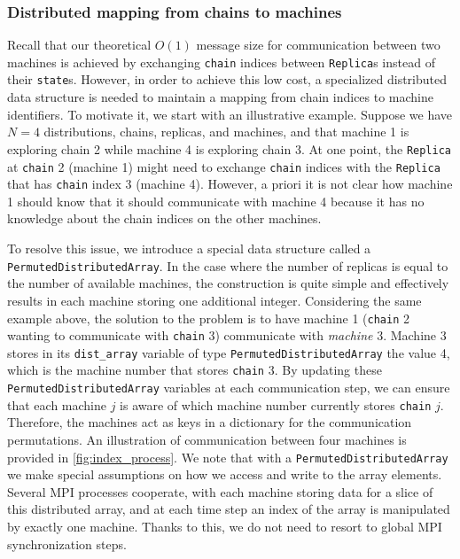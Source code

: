 \subsubsection{Distributed mapping from chains to machines}
\label{sec:permuted_dist_array}
Recall that our theoretical $O(1)$ message size for communication between two machines 
is achieved by exchanging \texttt{chain} indices between \texttt{Replica}s 
instead of their \texttt{state}s. 
However, in order to achieve this low cost, a specialized distributed data structure is 
needed to maintain a mapping from chain indices to machine identifiers. 
To motivate it, we start with an illustrative example. 
Suppose we have $N=4$ distributions, chains, replicas, and machines, and that 
machine 1 is exploring chain 2 while machine 4 is exploring chain 3.
At one point, the \texttt{Replica} at \texttt{chain} 2 (machine 1) might need to exchange
\texttt{chain} indices with the \texttt{Replica} that has \texttt{chain} index 3 (machine 4). 
However, a priori it is not clear how machine 1 should know that it should communicate 
with machine 4 because it has no knowledge about the chain indices on the other machines.

 
To resolve this issue, we introduce a special data structure called a 
\texttt{PermutedDistributedArray}. In the case where the number of replicas is 
equal to the number of available machines, the construction is quite simple
and effectively results in each machine storing one additional integer. 
Considering the same example above, the solution to the problem is to have
machine 1 (\texttt{chain} 2 wanting to communicate with \texttt{chain} 3) 
communicate with \textit{machine} 3. 
Machine 3 stores in its \texttt{dist\_array} variable of type 
\texttt{PermutedDistributedArray} the value 4, which is the machine number that 
stores \texttt{chain} 3. By updating these \texttt{PermutedDistributedArray} 
variables at each communication step, we can ensure that each machine $j$ is aware 
of which machine number currently stores \texttt{chain} $j$. 
Therefore, the machines act as keys in a dictionary for the communication 
permutations.
An illustration of communication between four machines is provided in 
\cref{fig:index_process}.
We note that with a \texttt{PermutedDistributedArray} we make special assumptions 
on how we access and write to the array elements. 
Several MPI processes cooperate, with each machine storing 
data for a slice of this distributed array, and at each time 
step an index of the array is manipulated by exactly one machine. 
Thanks to this, we do not need to resort to global MPI synchronization steps. 

